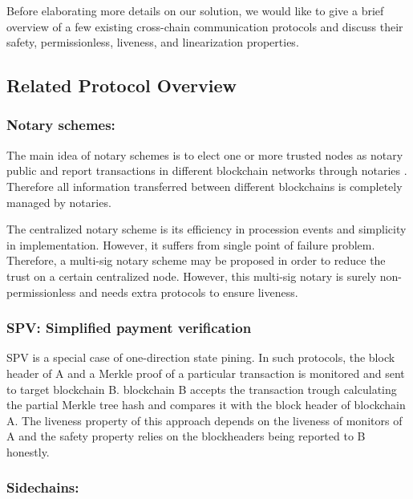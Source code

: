 \documentclass[pageno]{jpaper}
\begin{document}
Before elaborating more details on our solution, we would like to give a brief overview of a few existing cross-chain communication protocols and discuss their safety, permissionless, liveness, and linearization properties.


\subsection{Related Protocol Overview}
\subsubsection{Notary schemes:}

The main idea of notary schemes is to elect one or more trusted nodes as notary public and report transactions in different blockchain networks through notaries \cite{qin2018overview}. Therefore all information transferred between different blockchains is completely managed by notaries.

The centralized notary scheme is its efficiency in procession events and simplicity in implementation. However, it suffers from single point of failure problem. Therefore, a multi-sig notary scheme may be proposed in order to reduce the trust on a certain centralized node. However, this multi-sig notary is surely non-permissionless and needs extra protocols to ensure liveness.
\\
\subsubsection{SPV: Simplified payment verification}

    SPV is a special case of one-direction state pining. In such protocols, the block header of A and a Merkle proof of a particular transaction is monitored and sent to target blockchain B. blockchain B accepts the transaction trough calculating the partial Merkle tree hash and compares it with the block header of blockchain A. The liveness property of this approach depends on the liveness of monitors of A and the safety property relies on the blockheaders being reported to B honestly. 
\\
\subsubsection{Sidechains:}
\end{document}
